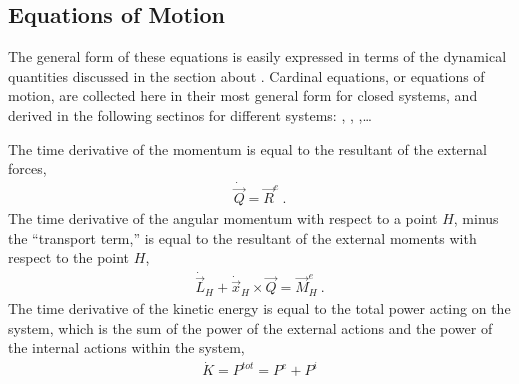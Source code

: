 \documentclass[letterpaper,10pt,english]{jupyterBook}
\begin{document}
\subsection{Equations of Motion}
\label{\detokenize{ch/dynamics-eom:equations-of-motion}}\label{\detokenize{ch/dynamics-eom:classical-mechanics-dynamics-eom-eom}}
\sphinxAtStartPar
The general form of these equations is easily expressed in terms of the dynamical quantities discussed in the section about . Cardinal equations, or equations of motion, are collected here in their most general form for closed systems, and derived in the following sectinos for different systems: {\hyperref[\detokenize{ch/dynamics-eom-point:classical-mechanics-dynamics-eom-point}]{}}, {\hyperref[\detokenize{ch/dynamics-eom-points:classical-mechanics-dynamics-eom-points}]{}}, {\hyperref[\detokenize{ch/dynamics-eom-rigid:classical-mechanics-dynamics-eom-rigid}]{}},…

\sphinxAtStartPar
{} The time derivative of the momentum is equal to the resultant of the external forces,
\begin{equation}\label{equation:ch/dynamics-eom:principle:q}
\begin{split}\dot{\vec{Q}} = \vec{R}^e \ .\end{split}
\end{equation}
\sphinxAtStartPar
{} The time derivative of the angular momentum with respect to a point \(H\), minus the “transport term,” is equal to the resultant of the external moments with respect to the point \(H\),
\begin{equation}\label{equation:ch/dynamics-eom:principle:l}
\begin{split}\dot{\vec{L}}_H + \dot{\vec{x}}_H \times \vec{Q} = \vec{M}_H^e \ .\end{split}
\end{equation}
\sphinxAtStartPar
{} The time derivative of the kinetic energy is equal to the total power acting on the system, which is the sum of the power of the external actions and the power of the internal actions within the system,
\begin{equation}\label{equation:ch/dynamics-eom:principle:k}
\begin{split}\dot{K} = P^{tot} = P^e + P^i\end{split}
\end{equation}
\end{document}
